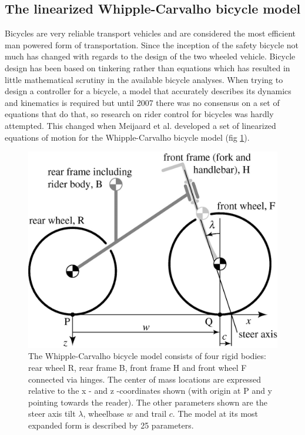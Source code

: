 \subsection{The linearized Whipple-Carvalho bicycle model}
Bicycles are  very reliable transport vehicles and are considered the most efficient man powered form of transportation. Since the inception of the safety bicycle not much has changed with regards to the design of the two wheeled vehicle.   Bicycle design has been based on tinkering rather than equations which has resulted in little mathematical scrutiny in the available bicycle analyses. When trying to design a controller for a bicycle, a model that accurately describes its dynamics and kinematics is required but until 2007 there was no consensus on a set of equations that do that, so research on rider control for bicycles was hardly attempted. This changed when Meijaard et al.\cite{meijaard2007linearized}  developed a set of linearized equations of motion for the Whipple-Carvalho bicycle  model (fig \ref{fig:figure2}).\par
\begin{figure}[ht]
    \centering
    \includegraphics[scale=0.3]{images/figure3_1.png}
    \caption{ The Whipple-Carvalho bicycle model consists of four rigid bodies: rear wheel R, rear frame B, front frame H and front wheel F connected via hinges. The center of mass locations are expressed relative to the x - and z -coordinates shown (with origin at P and y pointing towards the reader). The other parameters shown are the steer axis tilt \ensuremath{\lambda}, wheelbase \ensuremath{w} and trail \ensuremath{c}. The model at its most expanded form is described by 25 parameters.\cite{meijaard2007linearized}}
    \label{fig:figure2}
\end{figure}


